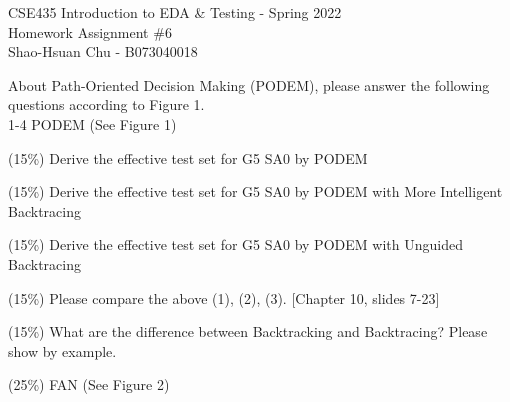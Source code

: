 \documentclass[12pt,answers]{exam}
\begin{document}
\begin{center}
\LARGE CSE435 Introduction to EDA \& Testing - Spring 2022 \\
\Large Homework Assignment \#6 \\
\Large Shao-Hsuan Chu - B073040018 \\
\end{center}
\bigskip

About Path-Oriented Decision Making (PODEM), please answer the following questions according to Figure 1. \\
1-4 PODEM (See Figure 1)
\begin{questions}
  \question (15\%) Derive the effective test set for G5 SA0 by PODEM
  
  \begin{solution}
    
  \end{solution}

  \question (15\%) Derive the effective test set for G5 SA0 by PODEM with More Intelligent Backtracing
  \begin{solution}
  \end{solution}

  \question (15\%) Derive the effective test set for G5 SA0 by PODEM with Unguided Backtracing
  \begin{solution}
  \end{solution}

  \question (15\%) Please compare the above (1), (2), (3). [Chapter 10, slides 7-23]
  \begin{solution}
  \end{solution}

  \question (15\%) What are the difference between Backtracking and Backtracing? Please show by example.
  \begin{solution}
  \end{solution}

  \question (25\%) FAN (See Figure 2)
  

\end{questions}
\end{document}
